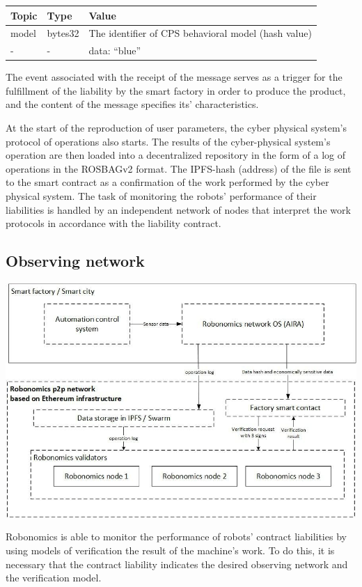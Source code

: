 \documentclass{article}
\begin{document}
\begin{tabular}{ |l |l |l }
 \textbf{Topic} & \textbf{Type} & \textbf{Value} \\ 
 \hline
 model & bytes32 & The identifier of CPS behavioral model (hash value) \\ 
 - &  - & data: “blue” \\ 
\end{tabular}

The event associated with the receipt of the message serves as a trigger for the fulfillment of the liability by the smart factory in order to produce the product, and the content of the message specifies its' characteristics.

At the start of the reproduction of user parameters, the cyber physical system's protocol of operations also starts. The results of the cyber-physical system's operation are then loaded into a decentralized repository in the form of a log of operations in the ROSBAGv2 format. The IPFS-hash (address) of the file is sent to the smart contract as a confirmation of the work performed by the cyber physical system. The task of monitoring the robots' performance of their liabilities is handled by an independent network of nodes that interpret the work protocols in accordance with the liability contract.

\subsection{Observing network}

\includegraphics[width=1\textwidth]{app-3.png} 

Robonomics is able to monitor the performance of robots' contract liabilities by using models of verification the result of the machine's work. To do this, it is necessary that the contract liability indicates the desired observing network and the verification model.
\end{document}
